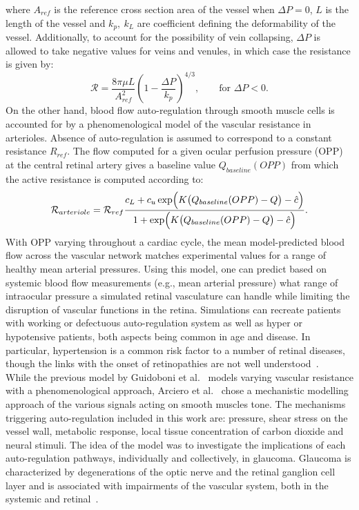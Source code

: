 \documentclass[12pt,a4paper]{article}
\begin{document}
where $A_{ref}$ is the reference cross section area of the vessel when $\Delta P = 0$, $L$ is the length of the vessel and $k_p,~k_L$ are coefficient defining the deformability of the vessel.
Additionally, to account for the possibility of vein collapsing, $\Delta P$ is allowed to take negative values for veins and venules, in which case the resistance is given by:
\begin{equation*}
  \label{eq:PassiveVariableResistanceCollapse}
  \mathcal{R} = \frac{8\pi\mu L}{A^2_{ref}}\left(1-\frac{\Delta P}{k_p}\right)^{4/3},\qquad \text{for } \Delta P<0.
\end{equation*}
On the other hand, blood flow auto-regulation through smooth muscle cells is accounted for by a phenomenological model of the vascular resistance in arterioles.
Absence of auto-regulation is assumed to correspond to a constant resistance $R_{ref}$.
The flow computed for a given ocular perfusion pressure (OPP) at the central retinal artery gives a baseline value $Q_{baseline}(OPP)$ from which the active resistance is computed according to:
\begin{equation*}
  \label{eq:ActiveResistancePhenomenological}
  \mathcal{R}_{arteriole} = \mathcal{R}_{ref}\frac{c_L + c_u\exp\Bigl(K\bigl(Q_{baseline}(OPP)- Q\bigr)-\hat c\Bigr)}{1 + \exp\Bigl(K\bigl(Q_{baseline}(OPP)- Q\bigr)-\hat c\Bigr)}.
\end{equation*}
With OPP varying throughout a cardiac cycle, the mean model-predicted blood flow across the vascular network matches experimental values for a range of healthy mean arterial pressures.
Using this model, one can predict based on systemic blood flow measurements (e.g., mean arterial pressure) what range of intraocular pressure a simulated retinal vasculature can handle while limiting the disruption of vascular functions in the retina.
Simulations can recreate patients with working or defectuous auto-regulation system as well as hyper or hypotensive patients, both aspects being common in age and disease.
In particular, hypertension is a common risk factor to a number of retinal diseases, though the links with the onset of retinopathies are not well understood~\cite{Klein_2004, Leeman_2019}.\\
While the previous model by Guidoboni et al.~\cite{Guidoboni_2014b} models varying vascular resistance with a phenomenological approach, Arciero et al.~\cite{Arciero_2013} chose a mechanistic modelling approach of the various signals acting on smooth muscles tone.
The mechanisms triggering auto-regulation included in this work are: pressure, shear stress on the vessel wall, metabolic response, local tissue concentration of carbon dioxide and neural stimuli.
The idea of the model was to investigate the implications of each auto-regulation pathways, individually and collectively, in glaucoma.
Glaucoma is characterized by degenerations of the optic nerve and the retinal ganglion cell layer and is associated with impairments of the vascular system, both in the systemic and retinal~\cite{Hulsman_2007, Bonomi_2000}.
\end{document}
